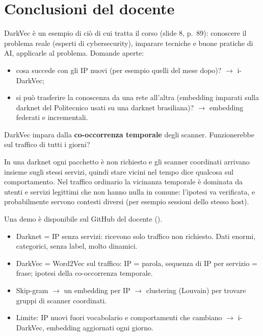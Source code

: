 \section{Conclusioni del docente}
DarkVec è un esempio di ciò di cui tratta il corso (slide 8, p.~89): conoscere il problema reale (esperti di cybersecurity), imparare
tecniche e buone pratiche di AI, applicarle al problema. Domande aperte:
\begin{itemize}
  \item cosa succede con gli IP nuovi (per esempio quelli del mese dopo)? $\rightarrow$ i-DarkVec;
  \item si può trasferire la conoscenza da una rete all'altra (embedding imparati sulla darknet del Politecnico usati su una darknet
        brasiliana)? $\rightarrow$ embedding federati e incrementali.
\end{itemize}
\begin{esame}
DarkVec impara dalla \textbf{co-occorrenza temporale} degli scanner. Funzionerebbe sul traffico di tutti i giorni?
\end{esame}
\begin{integrazione}
In una darknet ogni pacchetto è non richiesto e gli scanner coordinati arrivano insieme sugli stessi servizi, quindi stare vicini nel
tempo dice qualcosa sul comportamento. Nel traffico ordinario la vicinanza temporale è dominata da utenti e servizi legittimi che non
hanno nulla in comune: l'ipotesi va verificata, e probabilmente servono contesti diversi (per esempio sessioni dello stesso host).
\end{integrazione}
Una demo è disponibile sul GitHub del docente ().

\begin{sintesi}
\begin{itemize}
  \item Darknet = IP senza servizi: ricevono solo traffico non richiesto. Dati enormi, categorici, senza label, molto dinamici.
  \item DarkVec = Word2Vec sul traffico: IP = parola, sequenza di IP per servizio = frase; ipotesi della co-occorrenza temporale.
  \item Skip-gram $\rightarrow$ un embedding per IP $\rightarrow$ clustering (Louvain) per trovare gruppi di scanner coordinati.
  \item Limite: IP nuovi fuori vocabolario e comportamenti che cambiano $\rightarrow$ i-DarkVec, embedding aggiornati ogni giorno.
\end{itemize}
\end{sintesi}
